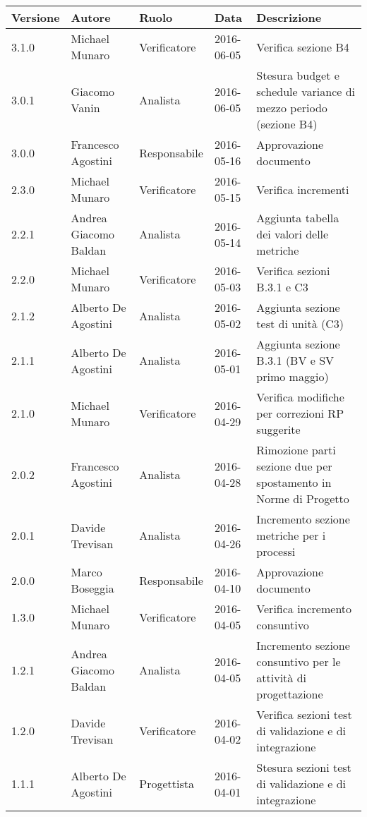 \documentclass{scalatekids-article}
\begin{document}
\begin{center}
  \begin{longtable}{| l | l | l | l | p{5cm} |}
    \hline
    Versione & Autore & Ruolo & Data & Descrizione \\
    \hline
    3.1.0 & Michael Munaro & Verificatore & 2016-06-05 & Verifica sezione B4\\
    \hline
    3.0.1 & Giacomo Vanin & Analista & 2016-06-05 & Stesura budget e schedule variance di mezzo periodo (sezione B4)\\
    \hline
    3.0.0 & Francesco Agostini & Responsabile & 2016-05-16 & Approvazione documento\\
    \hline
    2.3.0 & Michael Munaro & Verificatore & 2016-05-15 & Verifica incrementi\\
    \hline
    2.2.1 & Andrea Giacomo Baldan & Analista & 2016-05-14 & Aggiunta tabella dei valori delle metriche\\
    \hline
    2.2.0 & Michael Munaro & Verificatore & 2016-05-03 & Verifica sezioni B.3.1 e C3\\
    \hline
    2.1.2 & Alberto De Agostini & Analista & 2016-05-02 & Aggiunta sezione test di unità (C3)\\
    \hline
    2.1.1 & Alberto De Agostini & Analista & 2016-05-01 & Aggiunta sezione B.3.1 (BV e SV primo maggio) \\
    \hline
    2.1.0 & Michael Munaro & Verificatore & 2016-04-29 & Verifica modifiche per correzioni RP suggerite \\
    \hline
    2.0.2 & Francesco Agostini & Analista & 2016-04-28 & Rimozione parti sezione due per spostamento in Norme di Progetto\\
    \hline
    2.0.1 & Davide Trevisan & Analista & 2016-04-26 & Incremento sezione metriche per i processi \\
    \hline
    2.0.0 & Marco Boseggia & Responsabile & 2016-04-10 & Approvazione documento\\
    \hline
    1.3.0 & Michael Munaro & Verificatore & 2016-04-05 & Verifica incremento consuntivo\\
    \hline
    1.2.1 & Andrea Giacomo Baldan & Analista & 2016-04-05 & Incremento sezione consuntivo per le attività di progettazione\\
    \hline
    1.2.0 & Davide Trevisan & Verificatore & 2016-04-02 & Verifica sezioni test di validazione e di integrazione\\
    \hline
    1.1.1 & Alberto De Agostini & Progettista & 2016-04-01 & Stesura sezioni test di validazione e di integrazione\\

\end{longtable}
\end{center}
\end{document}
